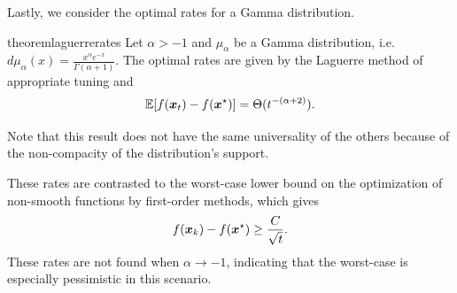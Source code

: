 \documentclass{article}
\begin{document}
Lastly, we consider the optimal rates for a Gamma distribution.

\begin{restatable}{theorem}{laguerrerates} \label{thm:laguerrerates}
Let $\alpha>-1$ and $\mu_\alpha$ be a Gamma distribution, i.e. $d\mu_\alpha(x)=\frac{x^\alpha e^{-x}}{\Gamma(\alpha+1)}$. The optimal rates are given by the Laguerre method of appropriate tuning and
\begin{equation}
    \mathbb{E}[f({\boldsymbol x}_t)-f({\boldsymbol x}^\star)]=\Theta(t^{-(\alpha+2)}) . 
\end{equation}
\end{restatable}
Note that this result does not have the same universality of the others because of the non-compacity of the distribution's support.

These rates are contrasted  to the worst-case lower bound on the optimization of non-smooth functions by first-order methods, which gives
\begin{equation*}
    f({\boldsymbol x}_k)-f({\boldsymbol x}^\star)\geq\frac{C}{\sqrt{t}} .
\end{equation*}
These rates are not found when $\alpha\rightarrow-1$, indicating that the worst-case is especially pessimistic in this scenario.
\end{document}
